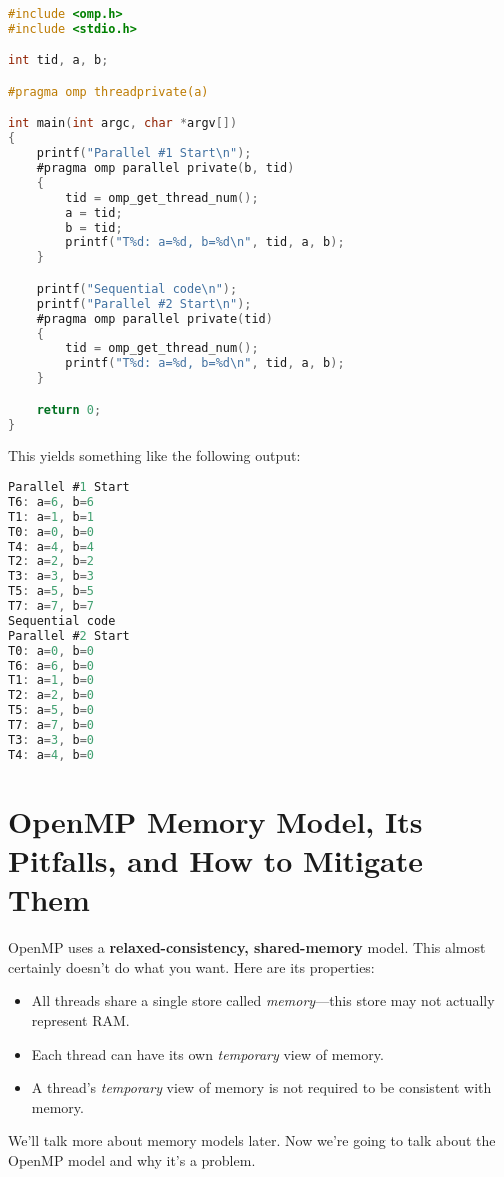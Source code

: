 \begin{lstlisting}[language=C,morekeywords={foreach,pragma,omp,parallel,single,nowait,task,untied,barrier,taskyield}]
#include <omp.h>
#include <stdio.h>

int tid, a, b;

#pragma omp threadprivate(a)

int main(int argc, char *argv[])
{
    printf("Parallel #1 Start\n");
    #pragma omp parallel private(b, tid)
    {
        tid = omp_get_thread_num();
        a = tid;
        b = tid;
        printf("T%d: a=%d, b=%d\n", tid, a, b);
    }

    printf("Sequential code\n");
    printf("Parallel #2 Start\n");
    #pragma omp parallel private(tid)
    {
        tid = omp_get_thread_num();
        printf("T%d: a=%d, b=%d\n", tid, a, b);
    }

    return 0;
}    
  \end{lstlisting}
This yields something like the following output:
\begin{lstlisting}[language=C,morekeywords={foreach,pragma,omp,parallel,single,nowait,task,untied,barrier,taskyield}]
% ./a.out
Parallel #1 Start
T6: a=6, b=6
T1: a=1, b=1
T0: a=0, b=0
T4: a=4, b=4
T2: a=2, b=2
T3: a=3, b=3
T5: a=5, b=5
T7: a=7, b=7
Sequential code
Parallel #2 Start
T0: a=0, b=0
T6: a=6, b=0
T1: a=1, b=0
T2: a=2, b=0
T5: a=5, b=0
T7: a=7, b=0
T3: a=3, b=0
T4: a=4, b=0
\end{lstlisting}

\section*{OpenMP Memory Model, Its Pitfalls, and How to Mitigate Them}
OpenMP uses a {\bf relaxed-consistency, shared-memory} model. This almost certainly doesn't 
do what you want. Here are its properties:

\begin{itemize}
    \item All threads share a single store called
      \emph{memory}---this store may not actually represent RAM.
    \item Each thread can have its own {\it temporary} view of memory.
    \item A thread's {\it temporary} view of memory is not required to be
      consistent with memory.
\end{itemize}

We'll talk more about memory models later. Now we're going to talk about 
the OpenMP model and why it's a problem.

